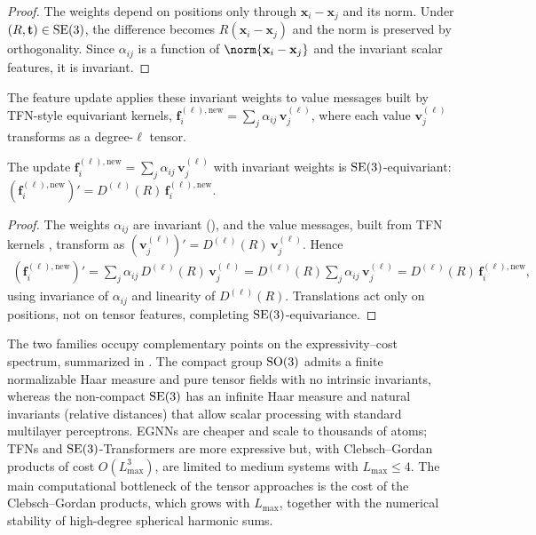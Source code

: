 \begin{proof}
The weights depend on positions only through $\mathbf{x}_i - \mathbf{x}_j$ and
its norm. Under $(R, \mathbf{t}) \in \operatorname{SE}(3)$, the difference becomes
$R(\mathbf{x}_i - \mathbf{x}_j)$ and the norm is preserved by orthogonality.
Since $\alpha_{ij}$ is a function of $\norm{\mathbf{x}_i - \mathbf{x}_j}$ and the
invariant scalar features, it is invariant.
\end{proof}

The feature update applies these invariant weights to value messages built by
TFN-style equivariant kernels, $\mathbf{f}_i^{(\ell),\text{new}} = \sum_{j}
\alpha_{ij}\, \mathbf{v}_j^{(\ell)}$, where each value $\mathbf{v}_j^{(\ell)}$
transforms as a degree-$\ell$ tensor.

\begin{theorem}
\label{thm:groups:se3-transformer-equivariance}
The update $\mathbf{f}_i^{(\ell),\text{new}} = \sum_{j} \alpha_{ij}\,
\mathbf{v}_j^{(\ell)}$ with invariant weights  is
$\operatorname{SE}(3)$-equivariant: $(\mathbf{f}_i^{(\ell),\text{new}})' = D^{(\ell)}(R)\,
\mathbf{f}_i^{(\ell),\text{new}}$.
\end{theorem}

\begin{proof}
The weights $\alpha_{ij}$ are invariant
(), and the value messages, built
from TFN kernels \citep{thomas2018tensorfieldnetworks}, transform as
$(\mathbf{v}_j^{(\ell)})' = D^{(\ell)}(R)\, \mathbf{v}_j^{(\ell)}$. Hence
\begin{align}
  (\mathbf{f}_i^{(\ell),\text{new}})'
  = \sum_{j} \alpha_{ij}\, D^{(\ell)}(R)\, \mathbf{v}_j^{(\ell)}
  = D^{(\ell)}(R) \sum_{j} \alpha_{ij}\, \mathbf{v}_j^{(\ell)}
  = D^{(\ell)}(R)\, \mathbf{f}_i^{(\ell),\text{new}},
\end{align}
using invariance of $\alpha_{ij}$ and linearity of $D^{(\ell)}(R)$. Translations
act only on positions, not on tensor features, completing $\operatorname{SE}(3)$-equivariance.
\end{proof}

The two families occupy complementary points on the expressivity--cost
spectrum, summarized in . The compact group $\operatorname{SO}(3)$
admits a finite normalizable Haar measure and pure tensor fields with no
intrinsic invariants, whereas the non-compact $\operatorname{SE}(3)$ has an infinite Haar
measure and natural invariants (relative distances) that allow scalar processing
with standard multilayer perceptrons. EGNNs are cheaper and scale to thousands
of atoms; TFNs and $\operatorname{SE}(3)$-Transformers are more expressive but, with
Clebsch--Gordan products of cost $O(L_{\max}^3)$, are limited to medium systems
with $L_{\max} \leq 4$. The main computational bottleneck of the tensor
approaches is the cost of the Clebsch--Gordan products, which grows with
$L_{\max}$, together with the numerical stability of high-degree spherical
harmonic sums.


